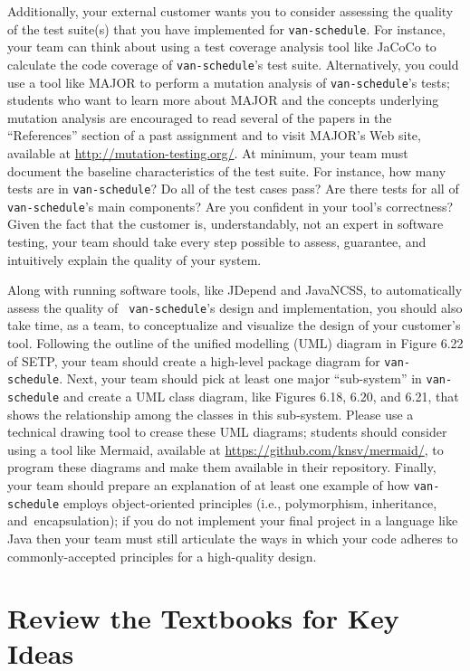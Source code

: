 Additionally, your external customer wants you to consider assessing the quality of the test suite(s) that you have
implemented for {\tt van-schedule}. For instance, your team can think about using a test coverage analysis tool like
JaCoCo to calculate the code coverage of {\tt van-schedule}'s test suite. Alternatively, you could use a tool like MAJOR
to perform a mutation analysis of {\tt van-schedule}'s tests; students who want to learn more about MAJOR and the
concepts underlying mutation analysis are encouraged to read several of the papers in the ``References'' section of a
past assignment and to visit MAJOR's Web site, available at \url{http://mutation-testing.org/}. At minimum, your team
must document the baseline characteristics of the test suite. For instance, how many tests are in {\tt van-schedule}?
Do all of the test cases pass?  Are there tests for all of {\tt van-schedule}'s main components? Are you confident in
your tool's correctness? Given the fact that the customer is, understandably, not an expert in software testing, your
team should take every step possible to assess, guarantee, and intuitively explain the quality of your system.

Along with running software tools, like JDepend and JavaNCSS, to automatically assess the quality of {\tt
van-schedule}'s design and implementation, you should also take time, as a team, to conceptualize and visualize the
design of your customer's tool. Following the outline of the unified modelling (UML) diagram in Figure 6.22 of SETP,
your team should create a high-level package diagram for {\tt van-schedule}. Next, your team should pick at least one
major ``sub-system'' in {\tt van-schedule} and create a UML class diagram, like Figures 6.18, 6.20, and 6.21, that shows
the relationship among the classes in this sub-system. Please use a technical drawing tool to crease these UML diagrams;
students should consider using a tool like Mermaid, available at \url{https://github.com/knsv/mermaid/}, to program
these diagrams and make them available in their repository. Finally, your team should prepare an explanation of at least
one example of how {\tt van-schedule} employs object-oriented principles (i.e., polymorphism, inheritance, \mbox{and
encapsulation)}; if you do not implement your final project in a language like Java then your team must still articulate
the ways in which your code adheres to commonly-accepted principles for a high-quality design.

\section*{Review the Textbooks for Key Ideas}

